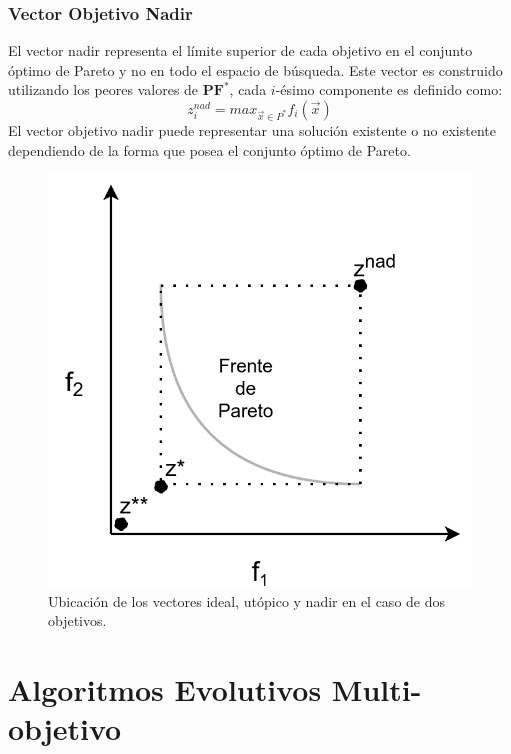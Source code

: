 \subsubsection*{Vector Objetivo Nadir}
El vector nadir representa el límite superior de cada objetivo en el conjunto óptimo de Pareto  y no en todo el espacio de búsqueda. 
%
Este vector es construido utilizando los peores valores de $\mathbf{PF}^*$, cada $i$-ésimo componente es definido como:
\begin{equation*}
z_i^{nad} = max_{\vec{x} \in P^*} f_i(\vec{x})
\end{equation*}
%
El vector objetivo nadir puede representar una solución existente o no existente dependiendo de la forma que posea el conjunto óptimo de Pareto.

\begin{figure}[h]
\centering
\scriptsize
\includegraphics[scale=0.3]
{Figures_Chapter2/Componentes_Multiobjetivo.png}
\decoRule
\caption{Ubicación de los vectores ideal, utópico y nadir en el caso de dos objetivos.}
\label{fig:Componentes_Multiobjetivo}
\end{figure}
\section{Algoritmos Evolutivos Multi-objetivo}

